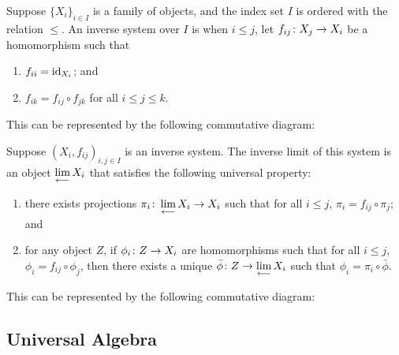 \begin{definition}
    Suppose \({\{X_i\}}_{i \in I}\) is a family of objects,
    and the index set \(I\) is ordered with the relation \(\leq\).
    An inverse system over \(I\) is when \(i \leq j\),
    let \(f_{ij}\colon X_j\to X_i\) be a homomorphism such that
    \begin{enumerate}[label={(\roman*)}, itemsep=0mm]
        \item \(f_{ii} = \operatorname{id}_{X_i}\); and
        \item \(f_{ik} = f_{ij} \circ f_{jk}\) for all \(i \leq j \leq k\).
    \end{enumerate}

    This can be represented by the following commutative diagram:
    \begin{center}
    \end{center}
\end{definition}

\begin{definition}
    Suppose \({(X_i,f_{ij})}_{i,j \in I}\) is an inverse system.
    The inverse limit of this system is an object \(\operatorname{\displaystyle\lim_{\longleftarrow}} X_i\)
    that satisfies the following universal property:
    \begin{enumerate}[label={(\roman*)}, itemsep=0mm]
        \item there exists projections \(\pi_i\colon\operatorname{\displaystyle\lim_{\longleftarrow}} X_i\to X_i\)
            such that for all \(i \leq j\), \(\pi_i = f_{ij}\circ\pi_j\); and
        \item for any object \(Z\), if \(\phi_i\colon Z\to X_i\) are homomorphisms
            such that for all \(i \leq j\), \(\phi_i = f_{ij}\circ\phi_j\),
            then there exists a unique \(\bar{\phi}\colon Z\to\operatorname{\displaystyle\lim_{\longleftarrow}} X_i\)
            such that \(\phi_i = \pi_i\circ\bar{\phi}\).
    \end{enumerate}

    This can be represented by the following commutative diagram:
    \begin{center}
    \end{center}
\end{definition}


\subsection{Universal Algebra}


